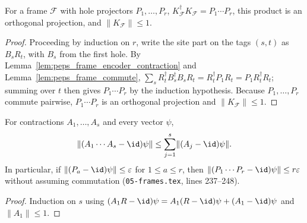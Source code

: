 \begin{lemma}
    \label{lem:peps_frame_gram}
    \leanok
    For a frame $\mathcal F$ with hole projectors $P_1,\dots,P_r$,
    $K_{\mathcal F}^\dagger K_{\mathcal F}=P_1\cdots P_r$, this product is an
    orthogonal projection, and $\lVert K_{\mathcal F}\rVert\le1$.
\end{lemma}

\begin{proof}\leanok
    Proceeding by induction on $r$, write the site part on the tags $(s,t)$ as
    $B_sR_t$, with $B_s$ from the first hole. By Lemma~\ref{lem:peps_frame_encoder_contraction} and Lemma~\ref{lem:peps_frame_commute},
    $\sum_s R_t^\dagger B_s^\dagger B_sR_t=R_t^\dagger P_1R_t=P_1 R_t^\dagger R_t$; summing over $t$
    then gives $P_1\cdots P_r$ by the induction hypothesis. Because $P_1,\dots,P_r$
    commute pairwise, $P_1\cdots P_r$ is an orthogonal projection and $\lVert K_{\mathcal F}\rVert\le1$.
\end{proof}

\begin{lemma}
    \label{lem:peps_frame_telescoping}
    \leanok
    For contractions $A_1,\dots,A_s$ and every vector $\psi$,
    \begin{align}
        \lVert(A_1\cdots A_s-\id)\psi\rVert
        \le\sum_{j=1}^s\lVert(A_j-\id)\psi\rVert .
        \label{eq:peps_frame_telescoping}
    \end{align}
    In particular, if $\lVert(P_a-\id)\psi\rVert\le\varepsilon$ for $1\le a\le r$, then $\lVert(P_1\cdots P_r-\id)\psi\rVert\le r\varepsilon$ without assuming commutation
    (\texttt{05-frames.tex}, lines 237--248).
\end{lemma}

\begin{proof}\leanok
    Induction on $s$ using
    $(A_1R-\id)\psi=A_1(R-\id)\psi+(A_1-\id)\psi$ and $\lVert A_1\rVert\le1$.
\end{proof}

